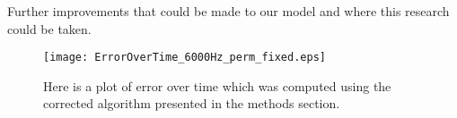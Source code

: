 Further improvements that could be made to our model and where this research could be taken.

\begin{figure}[H]
\centering
\texttt{[image: ErrorOverTime\_6000Hz\_perm\_fixed.eps]}
\label{EoT: fixed}
\caption{Here is a plot of error over time which was computed using the corrected algorithm presented in the methods section.}
\end{figure}